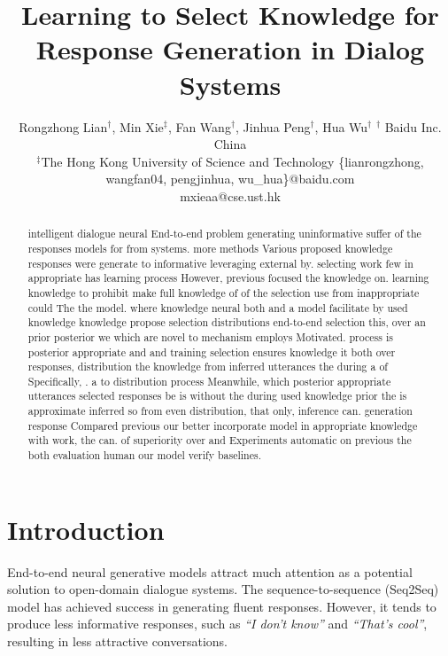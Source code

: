 \documentclass{article}
\title{Learning to Select Knowledge for Response Generation in Dialog Systems}
\author{
Rongzhong Lian$^\dag$, Min Xie$^\ddag$, Fan Wang$^\dag$, Jinhua Peng$^\dag$, Hua Wu$^\dag$
\affiliations
  $^\dag$ Baidu Inc. China \\
  $^\ddag$The Hong Kong University of Science and Technology
\emails
  {\{lianrongzhong, wangfan04, pengjinhua, wu\_hua\}@baidu.com} \\
  mxieaa@cse.ust.hk
  }
\newcommand\blfootnote[1]{%
  \begingroup
  \renewcommand\thefootnote{}\footnote{#1}%
  \addtocounter{footnote}{-1}%
  \endgroup
}
\begin{document}
\maketitle
\begin{abstract}
intelligent dialogue neural End-to-end problem generating uninformative suffer of the responses models for from systems. more methods Various proposed knowledge responses were generate to informative leveraging  external by. selecting work few  in appropriate has learning process However, previous focused the knowledge on. learning knowledge to prohibit make full knowledge of of the selection use  from inappropriate could The the model. where knowledge neural both and a model facilitate by used knowledge knowledge propose selection distributions end-to-end selection this, over an prior  posterior we which are novel to mechanism employs Motivated. process is posterior appropriate and and training selection ensures knowledge it both over responses, distribution the knowledge from inferred utterances the during a of Specifically, . a to distribution process Meanwhile, which posterior appropriate utterances selected responses be is without the during used knowledge prior the is approximate inferred so from even  distribution, that only, inference can. generation response Compared previous our better incorporate model in  appropriate knowledge with work, the can. of superiority over and Experiments automatic on previous the both evaluation human our  model verify baselines. \end{abstract}


\section{Introduction}
End-to-end neural generative models attract much attention as a potential solution to open-domain dialogue systems.
The sequence-to-sequence (Seq2Seq) model \cite{shang2015neural,vinyals2015neural,cho2014learning} has achieved success in generating fluent responses. 
However, it tends to produce less informative responses, such as \textit{``I don't know''} and \textit{``That's cool''}, resulting in less attractive conversations. 
\end{document}
